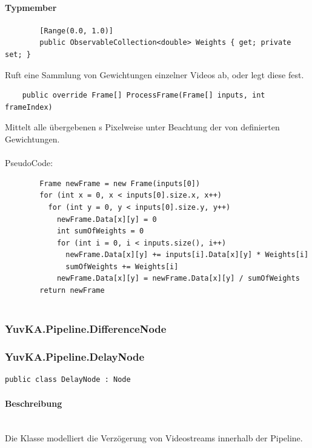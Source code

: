 \paragraph{Typmember}
\begin{itemize}

	\begin{verbatim}
		[Range(0.0, 1.0)]
		public ObservableCollection<double> Weights { get; private set; }
	\end{verbatim}
	Ruft eine Sammlung von Gewichtungen einzelner Videos ab, oder legt diese fest.

	\begin{verbatim}
	public override Frame[] ProcessFrame(Frame[] inputs, int frameIndex)
	\end{verbatim}
	Mittelt alle übergebenen s Pixelweise unter Beachtung der von  definierten Gewichtungen.\\~\\
	PseudoCode:
	\begin{verbatim}
		Frame newFrame = new Frame(inputs[0])
		for (int x = 0, x < inputs[0].size.x, x++)
		  for (int y = 0, y < inputs[0].size.y, y++)
		    newFrame.Data[x][y] = 0
		    int sumOfWeights = 0
		    for (int i = 0, i < inputs.size(), i++)
		      newFrame.Data[x][y] += inputs[i].Data[x][y] * Weights[i]
		      sumOfWeights += Weights[i]
		    newFrame.Data[x][y] = newFrame.Data[x][y] / sumOfWeights
		return newFrame
		
	\end{verbatim}
	
\end{itemize}

\subsubsection{YuvKA.Pipeline.DifferenceNode}

\subsubsection{YuvKA.Pipeline.DelayNode}

\begin{verbatim}
public class DelayNode : Node
\end{verbatim}

\paragraph{Beschreibung}~\\
Die Klasse  modelliert die Verzögerung von Videostreams innerhalb der Pipeline.

